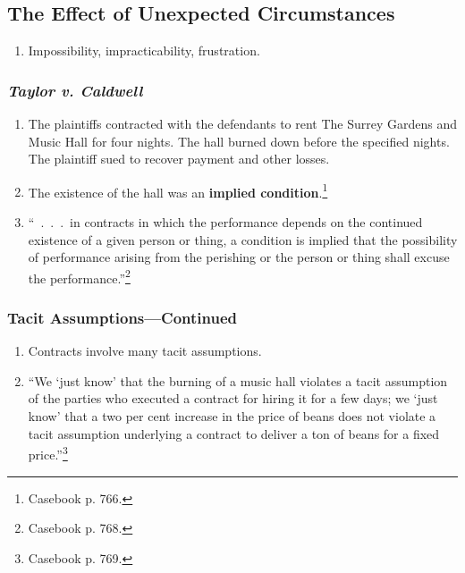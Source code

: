 \subsection{The Effect of Unexpected Circumstances}

\begin{enumerate}
    \item Impossibility, impracticability, frustration.
\end{enumerate}

\subsubsection{\emph{Taylor v. Caldwell}}

\begin{enumerate}
        \item The plaintiffs contracted with the defendants to rent The 
        Surrey Gardens and Music Hall for four nights. The hall burned down 
        before the specified nights. The plaintiff sued to recover payment and 
        other losses.
        \item The existence of the hall was an \textbf{implied 
        condition}.\footnote{Casebook p. 766.}
        \item ``~.~.~.~in contracts in which the performance depends on the 
        continued existence of a given person or thing, a condition is implied 
        that the possibility of performance arising from the perishing or the 
        person or thing shall excuse the performance.''\footnote{Casebook p. 
        768.}
\end{enumerate}

\subsubsection{Tacit Assumptions---Continued}

\begin{enumerate}
    \item Contracts involve many tacit assumptions.
    \item \enquote{We `just know' that the burning of a music hall violates a 
    tacit assumption of the parties who executed a contract for hiring it for 
    a few days; we `just know' that a two per cent increase in the price of 
    beans does not violate a tacit assumption underlying a contract to deliver 
    a ton of beans for a fixed price.}\footnote{Casebook p. 769.}
\end{enumerate}

